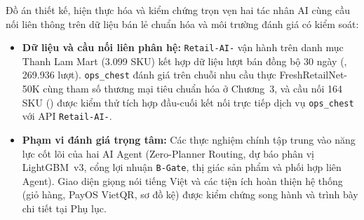 Đồ án thiết kế, hiện thực hóa và kiểm chứng trọn vẹn hai tác nhân AI cùng cầu nối liên thông trên dữ liệu bán lẻ chuẩn hóa và môi trường đánh giá có kiểm soát:
\begin{itemize}
    \item \textbf{Dữ liệu và cầu nối liên phân hệ:} \texttt{Retail-AI-} vận hành trên danh mục Thanh Lam Mart (3.099 SKU) kết hợp dữ liệu lượt bán đồng bộ 30 ngày (, 269.936 lượt). \texttt{ops\_chest} đánh giá trên chuỗi nhu cầu thực FreshRetailNet-50K cùng tham số thương mại tiêu chuẩn hóa ở Chương~3, và cầu nối 164 SKU () được kiểm thử tích hợp đầu-cuối kết nối trực tiếp dịch vụ \texttt{ops\_chest} với API \texttt{Retail-AI-}.
    \item \textbf{Phạm vi đánh giá trọng tâm:} Các thực nghiệm chính tập trung vào năng lực cốt lõi của hai AI Agent (Zero-Planner Routing, dự báo phân vị LightGBM~v3, cổng lợi nhuận \texttt{B-Gate}, thị giác sản phẩm và phối hợp liên Agent). Giao diện giọng nói tiếng Việt và các tiện ích hoàn thiện hệ thống (giỏ hàng, PayOS VietQR, sơ đồ kệ) được kiểm chứng song hành và trình bày chi tiết tại Phụ lục.
\end{itemize}
